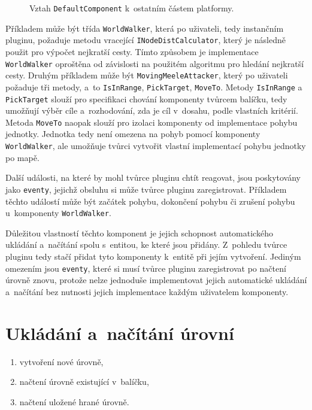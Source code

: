 \begin{figure}[h]
	\centering
	\fontsize{8pt}{11pt}\selectfont
	\def\svgwidth{\textwidth}
	
	\caption{Vztah \texttt{DefaultComponent} k~ostatním částem platformy.}
	\label{fig:defaultcomponentstructure}
\end{figure}


Příkladem může být třída \texttt{WorldWalker}, která po uživateli, tedy instančním pluginu, požaduje metodu vracející \texttt{INodeDistCalculator}, který je následně použit pro výpočet nejkratší cesty. Tímto způsobem je implementace \texttt{WorldWalker} oproštěna od závislosti na použitém algoritmu pro hledání nejkratší cesty. Druhým příkladem může být \texttt{MovingMeeleAttacker}, který po uživateli požaduje tři metody, a~to \texttt{IsInRange}, \texttt{PickTarget}, \texttt{MoveTo}. Metody \texttt{IsInRange} a \texttt{PickTarget} slouží pro specifikaci chování komponenty tvůrcem balíčku, tedy umožňují výběr cíle a~rozhodování, zda je cíl v~dosahu, podle vlastních kritérií. Metoda \texttt{MoveTo} naopak slouží pro izolaci komponenty od implementace pohybu jednotky. Jednotka tedy není omezena na pohyb pomocí komponenty \texttt{WorldWalker}, ale umožňuje tvůrci vytvořit vlastní implementací pohybu jednotky po mapě.

Další události, na které by mohl tvůrce pluginu chtít reagovat, jsou poskytovány jako \texttt{eventy}, jejichž obsluhu si může tvůrce pluginu zaregistrovat. Příkladem těchto událostí může být začátek pohybu, dokončení pohybu či zrušení pohybu u~komponenty \texttt{WorldWalker}.

Důležitou vlastností těchto komponent je jejich schopnost automatického ukládání a~načítání spolu s~entitou, ke které jsou přidány. Z~pohledu tvůrce pluginu tedy stačí přidat tyto komponenty k~entitě při jejím vytvoření. Jediným omezením jsou \texttt{eventy}, které si musí tvůrce pluginu zaregistrovat po načtení úrovně znovu, protože nelze jednoduše implementovat jejich automatické ukládání a~načítání bez nutnosti jejich implementace každým uživatelem komponenty. 

\section{Ukládání a~načítání úrovní}
\label{sec:loading}

\begin{enumerate}
	\item vytvoření nové úrovně,
	\item načtení úrovně existující v~balíčku,
	\item načtení uložené hrané úrovně.
\end{enumerate}

